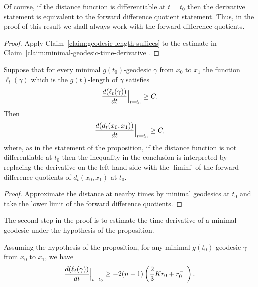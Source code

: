 \begin{remark}\label{rem:forward-difference-quotient}
Of course, if the distance function is differentiable at $t=t_0$
then the derivative statement is equivalent to the forward
difference quotient statement. Thus, in the proof of this result we
shall always work with the forward difference quotients.
\end{remark}

\begin{proof}
\sketch Apply Claim~\ref{claim:geodesic-length-suffices} to the estimate in
Claim~\ref{claim:minimal-geodesic-time-derivative}.

\end{proof}

\begin{claim}\label{claim:geodesic-length-suffices}
\label{geosuff}

Suppose that for every minimal $g(t_0)$-geodesic $\gamma$ from $x_0$
to $x_1$ the function $\ell_t(\gamma)$ which is the $g(t)$-length of
$\gamma$ satisfies
$$\frac{d(\ell_t(\gamma))}{dt}\Bigl|_{t=t_0}\Bigr.\ge C.$$
Then
$$\frac{d(d_t(x_0,x_1))}{dt}\Bigl|_{t=t_0}\Bigr.\ge C,$$
where, as in the statement of the proposition, if the distance
function is not differentiable at $t_0$ then the inequality in the
conclusion is interpreted by replacing the derivative on the
left-hand side with the $\liminf$ of the forward difference
quotients of $d_t(x_0,x_1)$ at  $t_0$.
\end{claim}

\begin{proof}
\sketch Approximate the distance at nearby times by minimal geodesics at
$t_0$ and take the lower limit of the forward difference quotients.
\end{proof}



The second step in the proof is to estimate the time derivative of a
minimal geodesic under the hypothesis of the proposition.

\begin{claim}\label{claim:minimal-geodesic-time-derivative}
\label{3.23}

Assuming the hypothesis of the proposition, for any
 minimal $g(t_0)$-geodesic $\gamma$ from $x_0$ to $x_1$, we have
$$\frac{d(\ell_t(\gamma))}{dt}\Bigl|_{t=t_0}\Bigr.\ge -2(n-1)
\left(\frac{2}{3}Kr_0+r_0^{-1}\right).$$
\end{claim}

